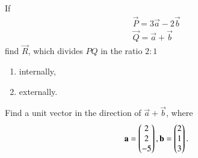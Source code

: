 %
\item If 
\begin{align}
\vec{P} = 3\vec{a}-2\vec{b}
\\
\vec{Q} = \vec{a}+\vec{b}
\end{align}
%
find $\vec{R}$, which divides $PQ$ in the ratio $2:1$
\begin{enumerate}
\item internally,
\item externally.
\end{enumerate}
%
%
\item Find a unit vector in the direction of $\vec{a}+\vec{b}$, where 
%
\begin{align}
\mathbf{a} = \begin{pmatrix}2\\2\\-5\end{pmatrix}, \mathbf{b} = \begin{pmatrix}2\\1\\3\end{pmatrix}.
\end{align}
%
%


